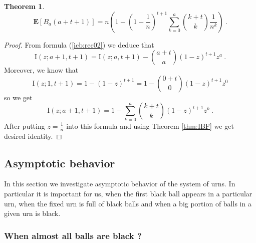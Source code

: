 \documentclass[submission]{dmtcs}
\newtheorem{theorem}{Theorem}
\newcommand{\E}[1]{\mathbf{E}\left[#1\right]}
\newcommand{\IBETAREG}[3]{\mathrm{I}\left(#1;#2,#3\right)}
\newcommand{\IBETAREGn}[2]{\mathrm{I}\left(\frac1n;#1,#2\right)}
\newcommand{\BigO}[1]{\mathrm{O}\left(#1\right)}
\begin{document}
\begin{theorem}
\label{thm:goodformula}
\begin{equation}
\label{eq:ya}
  \E{B_{a}(a+t+1)} =  
  n\left(1- \left(1-\frac{1}{n}\right)^{t+1} \sum_{k=0}^{a} \binom{k+t}{k}\frac{1}{n^k}\right)~.
  \end{equation}
\end{theorem} 

\begin{proof}
From formula (\ref{icb:rec02}) we deduce that
$$
  \IBETAREG{z}{a+1}{t+1} = 
	\IBETAREG{z}{a}{t+1} - \binom{a+t}{a} (1-z)^{t+1} z^a ~.
$$
Moreover, we know that 
$$
\IBETAREG{z}{1}{t+1}  = 1 - (1-z)^{t+1} = 
  1 - \binom{0+t}{0} (1-z)^{t+1} z^0
$$
so we get
$$
  \IBETAREG{z}{a+1}{t+1} = 1 - 
	\sum_{k=0}^{a} \binom{k+t}{k}(1-z)^{t+1}z^k~.
$$
After putting $z= \frac1n$ into this formula and using Theorem \ref{thm:IBF}
we get desired identity.
\end{proof}


\subsection{Asymptotic behavior}

In this section we investigate asymptotic behavior of the system of urns. 
In particular it is important for us, when the first black ball appears in a particular 
urn, when the fixed urn is full of black balls and when a big portion of balls in a given
urn is black.  


\subsubsection{When almost all balls are black ?}
\end{document}
